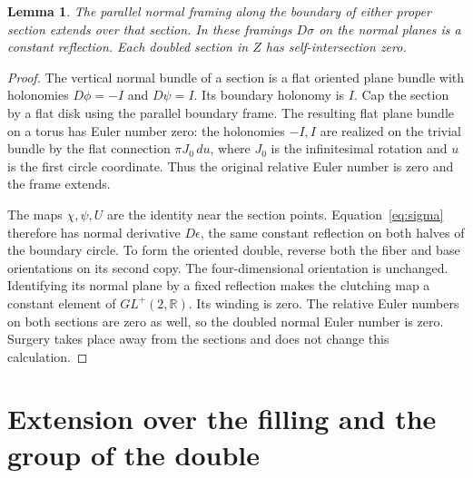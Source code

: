 \documentclass[11pt]{amsart}
\newtheorem{lemma}[theorem]{Lemma}
\theoremstyle{definition}
\theoremstyle{remark}
\begin{document}
\begin{lemma}\label{lem:frames}
The parallel normal framing along the boundary of either proper
section extends over that section. In these framings $D\sigma$ on
the normal planes is a constant reflection. Each doubled section
in $Z$ has self-intersection zero.
\end{lemma}
\begin{proof}
The vertical normal bundle of a section is a flat oriented plane
bundle with holonomies $D\phi=-I$ and $D\psi=I$. Its boundary
holonomy is $I$. Cap the section by a flat disk using the parallel
boundary frame. The resulting flat plane bundle on a torus has
Euler number zero: the holonomies $-I,I$ are realized on the trivial
bundle by the flat connection $\pi J_0\,du$, where $J_0$ is the
infinitesimal rotation and $u$ is the first circle coordinate.
Thus the original relative Euler number is zero and the frame extends.

The maps $\chi,\psi,U$ are the identity near the section points.
Equation~\eqref{eq:sigma} therefore has normal derivative
$D\epsilon$, the same constant reflection on both halves of the
boundary circle. To form the oriented double, reverse both the fiber
and base orientations on its second copy. The four-dimensional
orientation is unchanged. Identifying its normal plane by a fixed
reflection makes the clutching map a constant element of
$GL^+(2,\mathbb R)$. Its winding is zero. The relative Euler numbers
on both sections are zero as well, so the doubled normal Euler number
is zero. Surgery takes place away from the sections and does not
change this calculation.
\end{proof}

\section{Extension over the filling and the group of the double}
\label{sec:extension}
\end{document}
